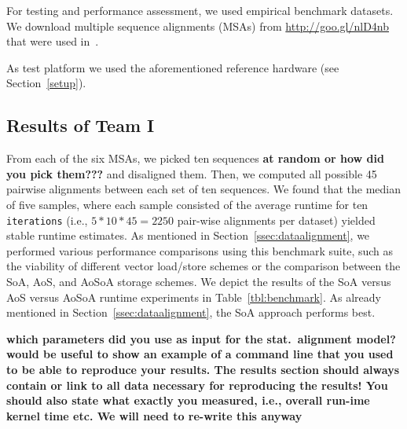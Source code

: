 \documentclass[runningheads,a4paper]{llncs}
\begin{document}

For testing and performance assessment, we used empirical benchmark datasets. We download multiple sequence alignments (MSAs) from \url{http://goo.gl/nlD4nb}
that were used in~\cite{bininda2005transalign}.

As test platform we used the aforementioned reference hardware (see Section~\ref{setup}).

\subsection{Results of Team I}
\label{res-team-1}

From each of the six MSAs, we picked ten sequences {\bf at random or how did you pick them???} and disaligned them.
Then, we computed all possible 45 pairwise alignments between each set of ten sequences. 
We found that the median of five samples, where each sample consisted of the average runtime for ten \texttt{iterations} 
(i.e., $5*10*45 = 2250$ pair-wise alignments per dataset) 
yielded stable runtime estimates. 
As mentioned in Section~\ref{ssec:dataalignment}, we performed various performance comparisons using this benchmark suite, 
such as the viability of different vector load/store schemes or the comparison between the SoA, AoS, and AoSoA storage schemes.
We depict the results of the SoA versus AoS versus AoSoA runtime experiments in Table~\ref{tbl:benchmark}. 
As already mentioned in Section~\ref{ssec:dataalignment}, the SoA approach performs best.

{\bf  which parameters did you use as input for the stat.~alignment model? would be useful to show an example of a command line that you used to be able to reproduce your results. The results section should always contain or link to all data necessary for reproducing the results! You should also state what exactly you measured, i.e., overall run-ime kernel time etc. We will need to re-write this anyway}
\end{document}
